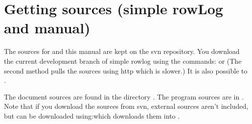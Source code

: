 \chapter{Getting sources (simple rowLog and manual)}
The sources for \srl and this manual are kept on the \srl svn repository. You download the current development branch of simple rowlog using the commands:
or
(The second method pulls the sources using http which is slower.)
It is also possible to .


The document sources are found in the directory . The program sources are in . Note that if you download the sources from svn, external sources aren't included, but can be downloaded using:which downloads them into .